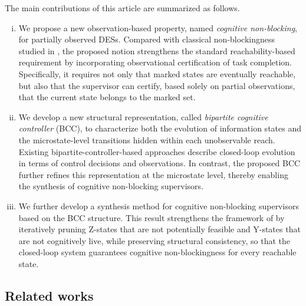 \documentclass[journal,twoside,web]{ieeecolor}
\begin{document}
The main contributions of this article are summarized as follows.
%
\begin{enumerate}[(i)]
    \item We propose a new observation-based property, named \emph{cognitive non-blocking}, for partially observed DESs.
    Compared with classical non-blockingness studied in  \cite{yin2016synthesis, yin2018synthesis}, the proposed notion strengthens the standard reachability-based requirement by incorporating observational certification of task completion.
    Specifically, it requires not only that marked states are eventually reachable, but also that the supervisor can certify, based solely on partial observations, that the current state belongs to the marked set.

    \item We develop a new structural representation, called \emph{bipartite cognitive controller} (BCC), to characterize both the evolution of information states and the microstate-level transitions hidden within each unobservable reach. 
    Existing bipartite-controller-based approaches \cite{yin2016uniform,zheng2026enforcement} describe closed-loop evolution in terms of control decisions and observations. In contrast, the proposed BCC further refines this representation at the microstate level, thereby enabling the synthesis of cognitive non-blocking supervisors.

    \item We further develop a synthesis method for cognitive non-blocking supervisors based on the BCC structure. 
    This result strengthens the framework of \cite{yin2016synthesis} by iteratively pruning Z-states that are not potentially feasible and Y-states that are not cognitively live, while preserving structural consistency, so that the closed-loop system guarantees cognitive non-blockingness for every reachable state.
    
\end{enumerate}

\subsection{Related works}
\end{document}
